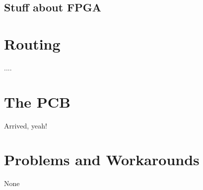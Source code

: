\subsection {Stuff about FPGA}

\section {Routing}

....

\section {The PCB}

Arrived, yeah!

\section {Problems and Workarounds}

None
